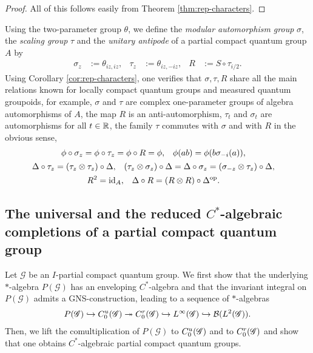\begin{proof}
  All of this follows easily from Theorem \ref{thm:rep-characters}.
\end{proof}
Using the two-parameter group $\theta$, we define the \emph{modular
  automorphism group} $\sigma$, the \emph{scaling group} $\tau$   and
the \emph{unitary antipode} of a partial compact quantum group $A$ by
\begin{align} \label{eq:rep-groups}
  \sigma_{z} &:=\theta_{iz,iz}, & \tau_{z} &:=\theta_{iz,-iz}, & R&:=S
  \circ \tau_{i/2}.
\end{align}
Using Corollary \ref{cor:rep-characters}, one verifies that
$\sigma,\tau,R$ share all the main relations known for locally compact
quantum groups and measured quantum groupoids, for example, $\sigma$
and $\tau$ are complex one-parameter groups of algebra automorphisms
of $A$, the map $R$ is an anti-automorphism,  $\tau_{t}$ and
$\sigma_{t}$ are automorphisms for all $t\in \mathbb{R}$, the family  $\tau$ commutes with
$\sigma$ and with $R$ in the obvious sense, 
  \begin{gather}
    \begin{aligned} \label{eq:modular}
      \phi\circ \sigma_{z} &= \phi \circ \tau_{z} = \phi \circ R =
      \phi, & \phi(ab) &= \phi(b\sigma_{-i}(a)),
    \end{aligned}
\\ \label{eq:scaling-modular-delta}
    \begin{aligned} 
    \Delta \circ \tau_{z} &= (\tau_{z} \otimes \tau_{z}) \circ \Delta,
    & (\tau_{z} \otimes \sigma_{z}) \circ \Delta &= \Delta \circ
    \sigma_{z} = (\sigma_{-z} \otimes \tau_{z}) \circ \Delta,      
  \end{aligned} \\
  \begin{aligned} \label{eq:unitary-antipode}
    R^{2} &= \operatorname{id}_{A}, & \Delta \circ R &= (R \otimes R) \circ
    \Delta^{\operatorname{\mathrm{op}}}.
  \end{aligned}
  \end{gather}




\subsection{The universal and the reduced $C^{*}$-algebraic completions of a partial compact quantum group}


 Let $\mathscr{G}$ be an  $I$-partial compact quantum group. We  first show that the  underlying $*$-algebra $P(\mathscr{G})$  has an enveloping  $C^{*}$-algebra and that the invariant integral on $P(\mathscr{G})$ admits  a GNS-construction, leading to a sequence of  $*$-algebras
\begin{align*}
P(\mathscr{G}) \hookrightarrow C^{u}_{0}(\mathscr{G}) \twoheadrightarrow
  C^{r}_{0}(\mathscr{G})\hookrightarrow
L^{\infty}(\mathscr{G}) \hookrightarrow {\cal B}(L^{2}(\mathscr{G})).
\end{align*}
Then, we lift the comultiplication of $P(\mathscr{G})$ to $C^{u}_{0}(\mathscr{G})$ and to $C^{r}_{0}(\mathscr{G})$ and show that one obtains $C^{*}$-algebraic partial compact quantum groups.  

